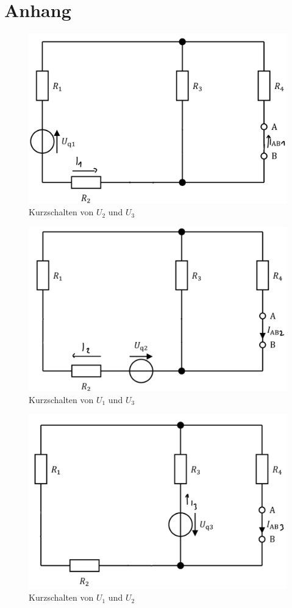 \section{Anhang}

\begin{figure}[ht]
    \includegraphics[width=0.6\linewidth]{Bilder/Helmholtz1.png}
    \caption{Kurzschalten von $U_2$ und $U_3$}
    \label{fig:helmholtz1}
\end{figure}
\begin{figure}[ht]
    \includegraphics[width=0.6\linewidth]{Bilder/Helmholtz2.png}
    \caption{Kurzschalten von $U_1$ und $U_3$}
    \label{fig:helmholtz2}
\end{figure}
\begin{figure}[t]
    \includegraphics[width=0.6\linewidth]{Bilder/Helmholtz3.png}
    \caption{Kurzschalten von $U_1$ und $U_2$}
    \label{fig:helmholtz3}
\end{figure}

